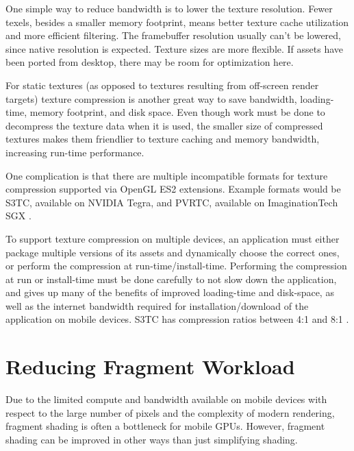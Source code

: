 
One simple way to reduce bandwidth is to lower the texture resolution.  Fewer
texels, besides a smaller memory footprint, means better texture cache
utilization and more efficient filtering.  The framebuffer resolution usually
can't be lowered, since native resolution is expected.  Texture sizes are more
flexible.  If assets have been ported from desktop, there may be room for
optimization here.


For static textures (as opposed to textures resulting from off-screen render
targets) texture compression is another great way to save bandwidth,
loading-time, memory footprint, and disk space.  Even though work must be done
to decompress the texture data when it is used, the smaller size of compressed
textures makes them friendlier to texture caching and memory bandwidth,
increasing run-time performance. 

One complication is that there are multiple incompatible formats for texture
compression supported via OpenGL ES2 extensions.  Example formats would be
S3TC, available on NVIDIA Tegra, and PVRTC, available on ImaginationTech SGX
\cite{Motorola11}.

To support texture compression on multiple devices, an application must either
package multiple versions of its assets and dynamically choose the correct
ones, or perform the compression at run-time/install-time.  Performing the
compression at run or install-time must be done carefully to not slow down the
application, and gives up many of the benefits of improved loading-time and
disk-space, as well as the internet bandwidth required for
installation/download of the application on mobile devices.  S3TC has
compression ratios between 4:1 and 8:1 \cite{Domine00}.

\section{Reducing Fragment Workload}
\label{Jon-McCaffrey-Reducing-Fragment-Workload}


Due to the limited compute and bandwidth available on mobile devices with
respect to the large number of pixels and the complexity of modern rendering,
fragment shading is often a bottleneck for mobile GPUs.  However, fragment
shading can be improved in other ways than just simplifying shading.

